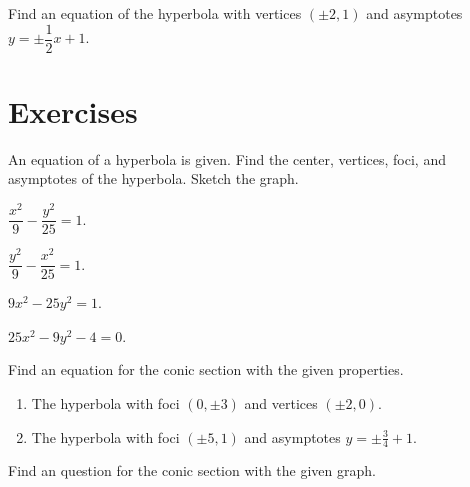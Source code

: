 \begin{example}
Find an equation of the hyperbola with vertices $(\pm 2, 1)$ and asymptotes $y=\pm\dfrac{1}{2}x+1$. 
\end{example}

\newpage
\section*{Exercises}

\begin{exercise}
    An equation of a hyperbola is given. Find the center, vertices, foci, and asymptotes of the hyperbola. Sketch the graph.\\
    \begin{enumerate*}
        \item $\dfrac{x^2}{9}-\dfrac{y^2}{25}=1$.
        \item $\dfrac{y^2}{9}-\dfrac{x^2}{25}=1$.
        \item $9x^2-25y^2=1$.
        \item $25x^2-9y^2-4=0$.
    \end{enumerate*}
\end{exercise}

\begin{exercise}
Find an equation for the conic section with the given properties.
\begin{enumerate}
    \item The hyperbola with foci $(0,\pm 3)$ and vertices $(\pm 2, 0)$.
    \item The hyperbola with foci $(\pm 5, 1)$ and asymptotes $y=\pm\frac34+1$.
\end{enumerate}
\end{exercise}

\newpage

\begin{exercise}
    Find an question for the conic section with the given graph.\\
\end{exercise}
\vspace*{-0.2\textheight}

